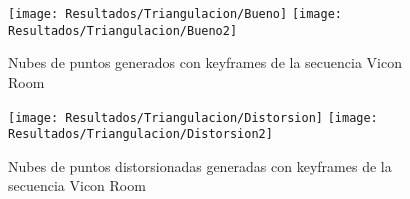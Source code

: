 \begin{figure}[H]
	\centering
	\texttt{[image: Resultados/Triangulacion/Bueno]}
	\texttt{[image: Resultados/Triangulacion/Bueno2]}
	\caption[Nubes de puntos generados con keyframes de la secuencia Vicon Room]{
	Nubes de puntos generados con keyframes de la secuencia Vicon Room}
	\label{imagen:Resultados/Triangulacion/Bueno}
\end{figure}

\begin{figure}[H]
	\centering
	\texttt{[image: Resultados/Triangulacion/Distorsion]}
	\texttt{[image: Resultados/Triangulacion/Distorsion2]}
	\caption[Nubes de puntos distorsionadas generadas  con keyframes de la secuencia Vicon Room]{
		Nubes de puntos distorsionadas generadas  con keyframes de la secuencia Vicon Room}
	\label{imagen:Resultados/Triangulacion/Distorsion}
\end{figure}
%
%
%
%
%
%
%
%
%
%
%
%
%

